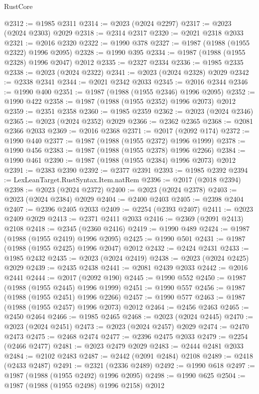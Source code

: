 \begin{lexlean}{RustCore}
\begin{coremodule}
@2312 := @1985 @2311
@2314 := @2023 (@2024 @2297)
@2317 := @2023 (@2024 @2303) @2029
@2318 := @2314 @2317
@2320 := @2021 @2318 @2033
@2321 := @2016 @2320
@2322 := @1990 @378
@2327 := @1987 (@1988 (@1955 @2322) @1996 @2095)
@2328 := @1990 @395
@2334 := @1987 (@1988 (@1955 @2328) @1996 @2047) @2012
@2335 := @2327 @2334
@2336 := @1985 @2335
@2338 := @2023 (@2024 @2322)
@2341 := @2023 (@2024 @2328) @2029
@2342 := @2338 @2341
@2344 := @2021 @2342 @2033
@2345 := @2016 @2344
@2346 := @1990 @400
@2351 := @1987 (@1988 (@1955 @2346) @1996 @2095)
@2352 := @1990 @422
@2358 := @1987 (@1988 (@1955 @2352) @1996 @2073) @2012
@2359 := @2351 @2358
@2360 := @1985 @2359
@2362 := @2023 (@2024 @2346)
@2365 := @2023 (@2024 @2352) @2029
@2366 := @2362 @2365
@2368 := @2081 @2366 @2033
@2369 := @2016 @2368
@2371 := @2017 (@2092 @174)
@2372 := @1990 @440
@2377 := @1987 (@1988 (@1955 @2372) @1996 @1999)
@2378 := @1990 @456
@2383 := @1987 (@1988 (@1955 @2378) @1996 @2266)
@2384 := @1990 @461
@2390 := @1987 (@1988 (@1955 @2384) @1996 @2073) @2012
@2391 := @2383 @2390
@2392 := @2377 @2391
@2393 := @1985 @2392
@2394 := LexLeanTarget.RustSyntax.Item.natRem
@2396 := @2017 (@2018 @2394)
@2398 := @2023 (@2024 @2372)
@2400 := @2023 (@2024 @2378)
@2403 := @2023 (@2024 @2384) @2029
@2404 := @2400 @2403
@2405 := @2398 @2404
@2407 := @2396 @2405 @2033
@2409 := @2254 (@2393 @2407)
@2411 := @2023 @2409 @2029
@2413 := @2371 @2411 @2033
@2416 := @2369 (@2091 @2413) @2108
@2418 := @2345 (@2360 @2416)
@2419 := @1990 @489
@2424 := @1987 (@1988 (@1955 @2419) @1996 @2095)
@2425 := @1990 @501
@2431 := @1987 (@1988 (@1955 @2425) @1996 @2047) @2012
@2432 := @2424 @2431
@2433 := @1985 @2432
@2435 := @2023 (@2024 @2419)
@2438 := @2023 (@2024 @2425) @2029
@2439 := @2435 @2438
@2441 := @2081 @2439 @2033
@2442 := @2016 @2441
@2444 := @2017 (@2092 @190)
@2445 := @1990 @552
@2450 := @1987 (@1988 (@1955 @2445) @1996 @1999)
@2451 := @1990 @557
@2456 := @1987 (@1988 (@1955 @2451) @1996 @2266)
@2457 := @1990 @577
@2463 := @1987 (@1988 (@1955 @2457) @1996 @2073) @2012
@2464 := @2456 @2463
@2465 := @2450 @2464
@2466 := @1985 @2465
@2468 := @2023 (@2024 @2445)
@2470 := @2023 (@2024 @2451)
@2473 := @2023 (@2024 @2457) @2029
@2474 := @2470 @2473
@2475 := @2468 @2474
@2477 := @2396 @2475 @2033
@2479 := @2254 (@2466 @2477)
@2481 := @2023 @2479 @2029
@2483 := @2444 @2481 @2033
@2484 := @2102 @2483
@2487 := @2442 (@2091 @2484) @2108
@2489 := @2418 (@2433 @2487)
@2491 := @2321 (@2336 @2489)
@2492 := @1990 @618
@2497 := @1987 (@1988 (@1955 @2492) @1996 @2095)
@2498 := @1990 @625
@2504 := @1987 (@1988 (@1955 @2498) @1996 @2158) @2012

\end{coremodule}
\end{lexlean}
